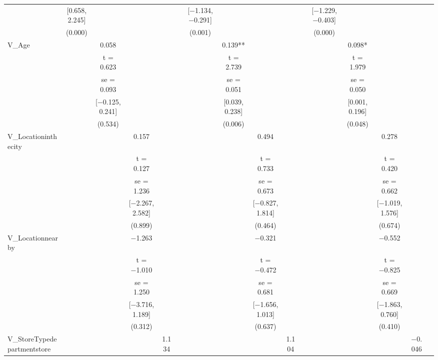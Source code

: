 \documentclass[]{report}
\begin{document}
\begin{table}
{\begin{tabular}[t]{lccccccccccccccc}
		& {}[\num{0.658}, \num{2.245}] &  &  &  &  & {}[\num{-1.134}, \num{-0.291}] &  &  &  &  & {}[\num{-1.229}, \num{-0.403}] &  &  &  & \\
		& (\num{0.000}) &  &  &  &  & (\num{0.001}) &  &  &  &  & (\num{0.000}) &  &  &  & \\
		V\_Age &  & \num{0.058} &  &  &  &  & \num{0.139}** &  &  &  &  & \num{0.098}* &  &  & \\
		&  & t = \num{0.623} &  &  &  &  & t = \num{2.739} &  &  &  &  & t = \num{1.979} &  &  & \\
		&  & se = \num{0.093} &  &  &  &  & se = \num{0.051} &  &  &  &  & se = \num{0.050} &  &  & \\
		&  & {}[\num{-0.125}, \num{0.241}] &  &  &  &  & {}[\num{0.039}, \num{0.238}] &  &  &  &  & {}[\num{0.001}, \num{0.196}] &  &  & \\
		&  & (\num{0.534}) &  &  &  &  & (\num{0.006}) &  &  &  &  & (\num{0.048}) &  &  & \\
		V\_Locationinthecity &  &  & \num{0.157} &  &  &  &  & \num{0.494} &  &  &  &  & \num{0.278} &  & \\
		&  &  & t = \num{0.127} &  &  &  &  & t = \num{0.733} &  &  &  &  & t = \num{0.420} &  & \\
		&  &  & se = \num{1.236} &  &  &  &  & se = \num{0.673} &  &  &  &  & se = \num{0.662} &  & \\
		&  &  & {}[\num{-2.267}, \num{2.582}] &  &  &  &  & {}[\num{-0.827}, \num{1.814}] &  &  &  &  & {}[\num{-1.019}, \num{1.576}] &  & \\
		&  &  & (\num{0.899}) &  &  &  &  & (\num{0.464}) &  &  &  &  & (\num{0.674}) &  & \\
		V\_Locationnearby &  &  & \num{-1.263} &  &  &  &  & \num{-0.321} &  &  &  &  & \num{-0.552} &  & \\
		&  &  & t = \num{-1.010} &  &  &  &  & t = \num{-0.472} &  &  &  &  & t = \num{-0.825} &  & \\
		&  &  & se = \num{1.250} &  &  &  &  & se = \num{0.681} &  &  &  &  & se = \num{0.669} &  & \\
		&  &  & {}[\num{-3.716}, \num{1.189}] &  &  &  &  & {}[\num{-1.656}, \num{1.013}] &  &  &  &  & {}[\num{-1.863}, \num{0.760}] &  & \\
		&  &  & (\num{0.312}) &  &  &  &  & (\num{0.637}) &  &  &  &  & (\num{0.410}) &  & \\
		V\_StoreTypedepartmentstore &  &  &  & \num{1.134} &  &  &  &  & \num{1.104} &  &  &  &  & \num{-0.046} & \\

\end{tabular}}
\end{table}
\end{document}
